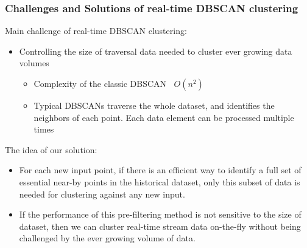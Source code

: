 \begin{frame}
    \frametitle{Challenges and Solutions of real-time DBSCAN clustering }
	    Main challenge of real-time DBSCAN clustering:
        \begin{itemize}
            \item Controlling the size of traversal data needed to cluster ever growing data volumes
            \begin{itemize}
                \item  Complexity of the classic DBSCAN $~$ $O(n^2)$
                \item  Typical DBSCANs traverse the whole dataset, and identifies the neighbors of each point. Each data element can be processed multiple times
            \end{itemize}
        \end{itemize}
	    The idea of our solution:
	    \begin{itemize}
	        \item \small For each new input point, if there is an efficient way to identify a full set of essential near-by points in the historical dataset, only this subset of data is needed for clustering against any new input.
            \item \small If the performance of this pre-filtering method is not sensitive to the size of dataset, then we can cluster real-time stream data on-the-fly without being challenged by the ever growing volume of data.
	    \end{itemize}
\end{frame}

